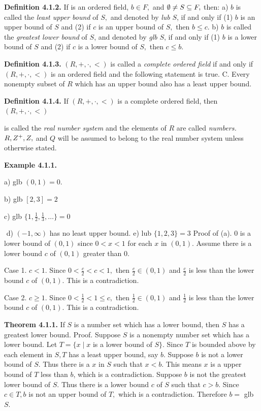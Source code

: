 \textbf{Definition 4.1.2.} If \of is an ordered field, $b\in F,$ and $\emptyset \neq S\subseteq F,$ then: \nl
a) $b$ is called the \textit{least upper bound} of $S,$ and denoted by \textit{lub} $S$, if and
only if
(1) $b$ is an upper bound of $S$ and (2) if $c$ is an upper bound of $S,$ then $b\leq c.$\nl
b) $b$ is called the \textit{greatest lower bound} of $S$, and denoted by \textit{glb} $S$, if and only if (1) $b$ is a lower
bound of $S$ and (2) if $c$ is a lower bound of $S,$ then $c\leq b.$\nl


\textbf{Definition 4.1.3.} $(R,+,\cdot ,<)$ is called a \textit{complete ordered field} if and only if $(R,+,\cdot ,<)$ is an ordered field and the following statement is true. \nl
C. Every nonempty subset of $R$ which has an upper bound also has a least upper bound. \nl

\parbox{5in}{\textbf{Definition 4.1.4.} If $(R,+,\cdot ,<)$ is a complete ordered field, then $(R,+,\cdot,<)$} is called the \textit{real number system} and the elements of $R$ are called \textit{numbers.} $R, Z^{+}, Z,$ and $Q$ will be
assumed to belong to the real number system un­less otherwise stated.\nl

\textbf{Example 4.1.1.}\nl

a) glb $(0, 1) = 0.$ \nl

b) glb $[2,3] = 2$\nl

c) glb $\{1, \frac{1}{2}, \frac{1}{3}, \dots \} = 0$\nl


\newpage

$ $\nl
d) $(-1, \infty)$ has no least upper bound. \nl
e) lub $\{1, 2, 3 \} = 3$\nl
Proof of (a). 0 is a lower bound of $(0,1)$ since $0 < x < 1$ for each $x$ in $(0,1).$
Assume there is a lower bound $c$ of $(0,1)$ greater than $0.$\nl

Case 1. $c<1.$ Since $0 <\frac{c}{2} < c <1,$ then $\frac{c}{2}\in (0,1)$ and $\frac{c}{2}$ is less than the lower bound $c$ of $(0,1).$ This is a contradiction. \nl

Case 2. $c\geq 1.$ Since $0 <\frac{1}{2} <1 \leq c,$ then $\frac{1}{2}\in (0,1)$ and $\frac{1}{2}$ is less than the lower bound $c$ of $(0,1).$   This is a contradiction. \nl

\textbf{Theorem 4.1.1.} If $S$ is a number set which has a lower bound, then $S$ has a greatest
lower bound.\nl
Proof. Suppose $S$ is a nonempty number set which has a lower bound. Let
$T = \{x \mid x $ is a lower bound of $S\}$. Since $T$ is bounded above by each element in $S, T$ has a
least upper bound, say $b.$ Suppose $b$ is not a lower bound of $S.$ Thus there is a $x$ in $S$ such
that $x < b.$ This means $x$ is a upper bound of $T$ less than $b$, which is a contradiction.  Suppose $b$
is not the greatest lower bound of $S.$  Thus there is a lower bound $c$ of $S$ such that $c > b.$  Since
$c\in T, b$ is not an upper bound of $T,$ which is a contradiction.  Therefore $b =$ glb $S.$\nl

